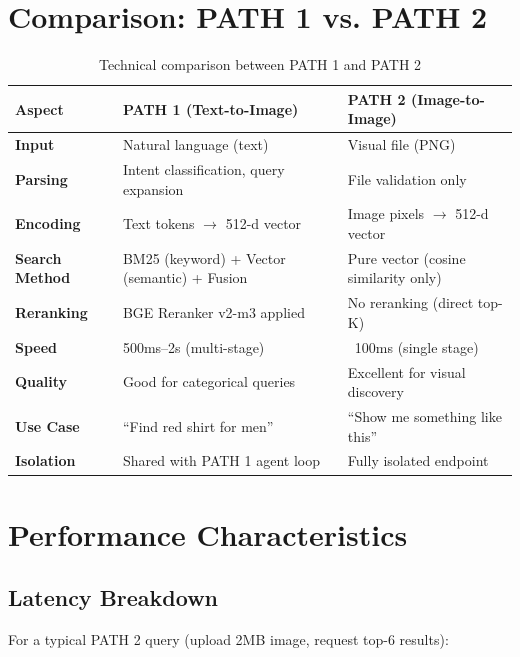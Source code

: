 \section{Comparison: PATH 1 vs. PATH 2}

\begin{table}[H]
\centering
\begin{tabular}{p{2cm}p{3.5cm}p{3.5cm}}
\toprule
\textbf{Aspect} & \textbf{PATH 1 (Text-to-Image)} & \textbf{PATH 2 (Image-to-Image)}\\
\midrule
\textbf{Input} & Natural language (text) & Visual file (PNG) \\
\textbf{Parsing} & Intent classification, query expansion & File validation only \\
\textbf{Encoding} & Text tokens $\rightarrow$ 512-d vector & Image pixels $\rightarrow$ 512-d vector \\
\textbf{Search Method} & BM25 (keyword) + Vector (semantic) + Fusion & Pure vector (cosine similarity only) \\
\textbf{Reranking} & BGE Reranker v2-m3 applied & No reranking (direct top-K) \\
\textbf{Speed} & 500ms--2s (multi-stage) & ~100ms (single stage) \\
\textbf{Quality} & Good for categorical queries & Excellent for visual discovery \\
\textbf{Use Case} & ``Find red shirt for men'' & ``Show me something like this'' \\
\textbf{Isolation} & Shared with PATH 1 agent loop & Fully isolated endpoint \\
\bottomrule
\end{tabular}
\caption{Technical comparison between PATH 1 and PATH 2}
\label{tab:path_comparison}
\end{table}

\section{Performance Characteristics}

\subsection{Latency Breakdown}

For a typical PATH 2 query (upload 2MB image, request top-6 results):

